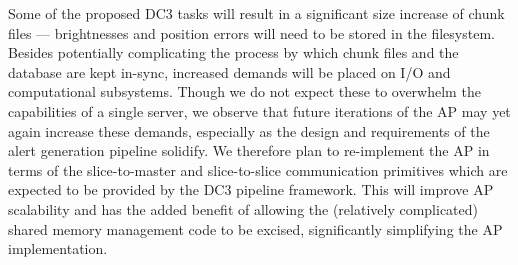Some of the proposed DC3 tasks will result in a significant size increase of
chunk files --- brightnesses and position errors will need to be stored in the
filesystem. Besides potentially complicating the process by which chunk
files and the database are kept in-sync, increased demands will be placed on
I/O and computational subsystems. Though we do not expect these to overwhelm
the capabilities of a single server, we observe that future iterations of the
AP may yet again increase these demands, especially as the design and
requirements of the alert generation pipeline solidify. We therefore plan to
re-implement the AP in terms of the slice-to-master and slice-to-slice
communication primitives which are expected to be provided by the DC3 pipeline
framework. This will improve AP scalability and has the added benefit of
allowing the (relatively complicated) shared memory management code to be
excised, significantly simplifying the AP implementation.


